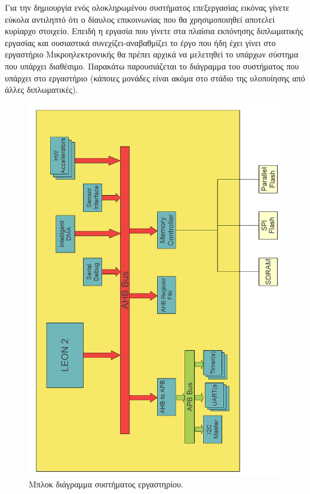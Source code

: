 \documentclass[a4paper,10pt]{article}
\numberwithin{figure}{section}
\numberwithin{table}{section}
\begin{document}
Για την δημιουργία ενός ολοκληρωμένου συστήματος επεξεργασίας εικόνας γίνετε εύκολα αντιληπτό ότι ο δίαυλος επικοινωνίας που θα χρησιμοποιηθεί αποτελεί κυρίαρχο στοιχείο. Επειδή η εργασία που γίνετε στα πλαίσια εκπόνησης διπλωματικής εργασίας και ουσιαστικά συνεχίζει-αναβαθμίζει το έργο που ήδη έχει γίνει στο εργαστήριο Μικροηλεκτρονικής θα πρέπει αρχικά να μελετηθεί το υπάρχων σύστημα που υπάρχει διαθέσιμο. Παρακάτω παρουσιάζεται το διάγραμμα του συστήματος που υπάρχει στο εργαστήριο (κάποιες μονάδες είναι ακόμα στο στάδιο της υλοποίησης από άλλες διπλωματικές).
\newpage
\begin{figure}[h!]
 \centering
 \includegraphics[bb=0 0 745 1091,scale=0.45]{./Images/VLSI_LAB_LEAN2.png}
 \caption{Μπλοκ διάγραμμα συστήματος εργαστηρίου.}
\end{figure}
\end{document}
